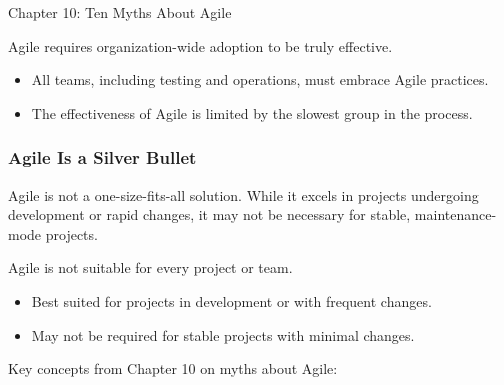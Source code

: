 \begin{notes}{Chapter 10: Ten Myths About Agile}
    \begin{highlight}
    
        Agile requires organization-wide adoption to be truly effective.
        
        \begin{itemize}
            \item All teams, including testing and operations, must embrace Agile practices.
            \item The effectiveness of Agile is limited by the slowest group in the process.
        \end{itemize}
    
    \end{highlight}
    
    \subsubsection*{Agile Is a Silver Bullet}
    
    Agile is not a one-size-fits-all solution. While it excels in projects undergoing development or rapid changes, it may not be necessary for stable, maintenance-mode projects.
    
    \begin{highlight}
    
        Agile is not suitable for every project or team.
        
        \begin{itemize}
            \item Best suited for projects in development or with frequent changes.
            \item May not be required for stable projects with minimal changes.
        \end{itemize}
    
    \end{highlight}
    
    \begin{highlight}
    
        Key concepts from Chapter 10 on myths about Agile:
        

\end{highlight}
\end{notes}
